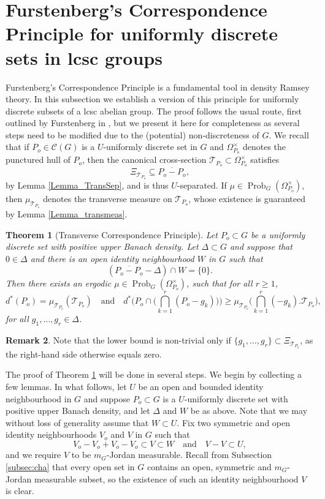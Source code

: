 \documentclass[12pt,reqno,a4paper]{amsart}
\numberwithin{equation}{section}
\newcommand{\cT}{\mathcal{T}}
\newcommand{\qand}{\quad \textrm{and} \quad}
\DeclareMathOperator{\Prob}{Prob}
\theoremstyle{theorem}
\newtheorem{theorem}{Theorem}[section]
\theoremstyle{task}
\theoremstyle{definition}
\newtheorem{remark}[theorem]{Remark}
\begin{document}
\section{Furstenberg's Correspondence Principle for uniformly discrete sets in lcsc groups}
\label{subsec:corr}

Furstenberg's Correspondence Principle is a fundamental tool in density Ramsey theory. 
In this subsection we establish a version of this principle for uniformly discrete subsets of a lcsc abelian group. The proof follows the usual route, first outlined by Furstenberg in \cite{F}, but we present it here for completeness as several steps need to be modified due to the (potential) non-discreteness of $G$. We recall that if $P_o \in \mathscr{C}(G)$ is a $U$-uniformly discrete set in $G$ and $\Omega_{P_o}^{\times}$ denotes the punctured hull of $P_o$, then the canonical cross-section $\cT_{P_o} \subset \Omega_{P_o}^{\times}$ satisfies 
\[
\Xi_{\cT_{P_o}} \subseteq \overline{P_o - P_o},
\]
by Lemma \ref{Lemma_TransSep}, and is thus $U$-separated. If $\mu \in \Prob_G(\Omega_{P_o}^{\times})$, then $\mu_{\cT_{P_o}}$ denotes the transverse measure on $\cT_{P_o}$, whose existence is guaranteed by Lemma \ref{Lemma_transmeas}.

\begin{theorem}[Transverse Correspondence Principle]
\label{Thm_CorrPrinciple}
Let $P_o \subset G$ be a uniformly discrete set with positive upper Banach density. Let $\Delta \subset G$ and suppose that $0 \in \Delta$ and there is an open identity neighbourhood $W$ in $G$
such that 
\[
(\overline{P_o - P_o} - \Delta) \cap W = \{0\}.
\]   
Then there exists an ergodic $\mu \in \Prob_G(\Omega_{P_o}^{\times})$, such that for all $r \geq 1$,
\[
d^*(P_o) = \mu_{\cT_{P_o}}(\cT_{P_o}) 
\qand 
d^*\Big(P_o \cap \Big( \bigcap_{k=1}^r (P_o - g_k) \Big)\Big)
\geq 
\mu_{\cT_{P_o}}\Big(\bigcap_{k=1}^r (-g_k).\cT_{P_o}\Big),
\]
for all $g_1,\ldots,g_r \in \Delta$.
\end{theorem}

\begin{remark}
Note that the lower bound is non-trivial only if $\{g_1,\ldots,g_r\} \subset \Xi_{\cT_{P_o}}$, as the right-hand side otherwise equals zero.
\end{remark}

The proof of Theorem \ref{Thm_CorrPrinciple} will be done in several steps. We begin by collecting a few lemmas. In what follows, let $U$ be an open and bounded identity neighbourhood in $G$ and suppose $P_o \subset G$ is a $U$-uniformly discrete set with positive upper Banach density, and let $\Delta$ and $W$ be as above. Note that we may without loss of generality assume that $W \subset U$. Fix two symmetric and open identity neighbourhoods $V_o$ and $V$ in $G$ such that
\[
V_o - V_o + V_o - V_o \subset V \subset W \qand V-V \subset U,
\]
and we require $V$ to be $m_G$-Jordan measurable. Recall from Subsection \ref{subsec:cha} that every open set in $G$ contains an open, 
symmetric and $m_G$-Jordan measurable subset, so the existence of 
such an identity neighbourhood $V$ is clear.
\end{document}
